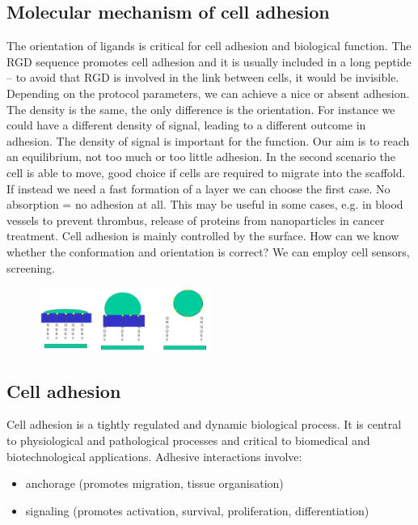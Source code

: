 \subsection{Molecular mechanism of cell adhesion}
The orientation of ligands is critical for cell adhesion and biological function. The RGD sequence promotes cell adhesion and it is usually included in a long peptide – to avoid that RGD is involved in the link between cells, it would be invisible. Depending on the protocol parameters, we can achieve a nice or absent adhesion. The density is the same, the only difference is the orientation.
For instance we could have a different density of signal,  leading to a different outcome in adhesion. The density of signal is important for the function.  Our aim is to reach an equilibrium, not too much or too little adhesion. In the second scenario the cell is able to move, good choice if cells are required to migrate into the scaffold. If instead we need a fast formation of a layer we can choose the first case.
No absorption = no adhesion at all. This may be useful in some cases, e.g. in blood vessels to prevent thrombus, release of proteins from nanoparticles in cancer treatment.
Cell adhesion is mainly controlled by the surface. How can we know whether the conformation and orientation is correct? We can employ cell sensors, screening.

\begin{figure}[h]
\centering
\includegraphics[width=0.5\textwidth]{adhesion}
\caption{\label{fig:adhesion}}
\end{figure}

\subsection{Cell adhesion}
Cell adhesion is a tightly regulated and dynamic biological process. It is central to physiological and pathological processes and critical to biomedical and biotechnological applications.
Adhesive interactions involve:
\begin{itemize}
\item anchorage (promotes migration, tissue organisation)
\item signaling (promotes activation, survival, proliferation, differentiation)
\end{itemize}

